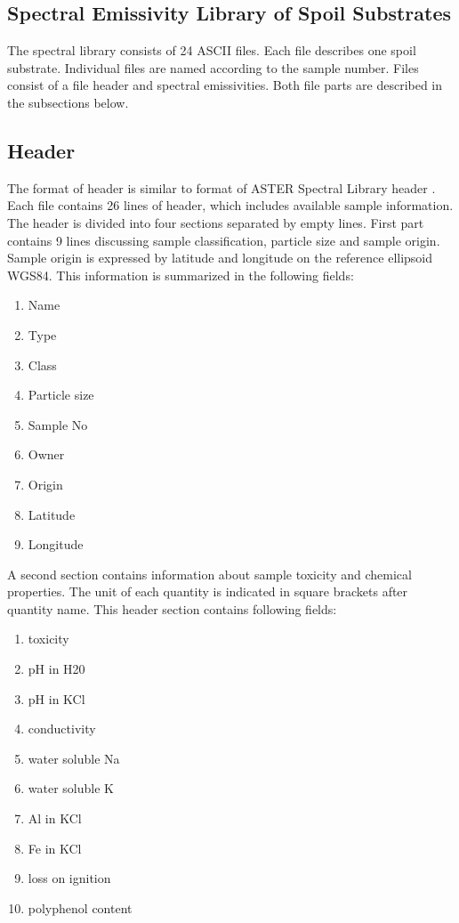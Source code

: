 \begin{appendices}

\chapter{Spectral Emissivity Library of Spoil Substrates}
\label{app:Library}

The spectral library consists of 24 ASCII files. Each file describes one spoil substrate. Individual files are named according to the sample number. Files consist of a file header and spectral emissivities. Both file parts are described in the subsections below.

\section{Header}

The format of header is similar to format of ASTER Spectral Library header \cite{BH09}. Each file contains 26 lines of header, which includes available sample information. The header is divided into four sections separated by empty lines. First part contains 9 lines discussing sample classification, particle size and sample origin. Sample origin is expressed by latitude and longitude on the reference ellipsoid WGS84. This information is summarized in the following fields:

\begin{enumerate}
	\item	Name
	\item Type
	\item Class
	\item Particle size
	\item Sample No
	\item Owner
	\item Origin
	\item Latitude
	\item Longitude
\end{enumerate}

A second section contains information about sample toxicity and chemical properties. The unit of each quantity is indicated in square brackets after quantity name. This header section contains following fields:

\begin{enumerate}
	\item toxicity
	\item pH in H20
	\item pH in KCl
	\item conductivity
	\item water soluble Na
	\item water soluble K
	\item Al in KCl
	\item Fe in KCl
	\item loss on ignition
	\item polyphenol content
\end{enumerate}


\end{appendices}
